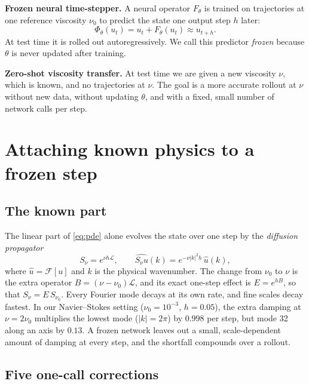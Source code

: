 \documentclass{article}
\theoremstyle{plain}
\newcommand{\F}{\mathcal{F}}
\newcommand{\Lop}{\mathcal{L}}
\begin{document}
\textbf{Frozen neural time-stepper.}
A neural operator $F_\theta$ is trained on trajectories at one reference viscosity $\nu_0$ to predict the state one output step $h$ later:
\begin{equation}
  \Phi_\theta(u_t) = u_t + F_\theta(u_t) \approx u_{t+h}.
  \label{eq:stepper}
\end{equation}
At test time it is rolled out autoregressively. We call this predictor \emph{frozen} because $\theta$ is never updated after training.

\textbf{Zero-shot viscosity transfer.}
At test time we are given a new viscosity $\nu$, which is known, and no trajectories at $\nu$.
The goal is a more accurate rollout at $\nu$ without new data, without updating $\theta$, and with a fixed, small number of network calls per step.

\section{Attaching known physics to a frozen step}
\label{sec:method}

\subsection{The known part}
\label{sec:known}

The linear part of \cref{eq:pde} alone evolves the state over one step by the \emph{diffusion propagator}
\begin{equation}
  S_\nu = e^{\nu h\Lop},\qquad
  \widehat{S_\nu u}(k) = e^{-\nu|k|^2h}\,\hat u(k),
  \label{eq:semigroup}
\end{equation}
where $\hat u=\F[u]$ and $k$ is the physical wavenumber.
The change from $\nu_0$ to $\nu$ is the extra operator $B=(\nu-\nu_0)\Lop$, and its exact one-step effect is $E=e^{hB}$, so that $S_\nu=E\,S_{\nu_0}$.
Every Fourier mode decays at its own rate, and fine scales decay fastest.
In our Navier--Stokes setting ($\nu_0=10^{-3}$, $h=0.05$), the extra damping at $\nu=2\nu_0$ multiplies the lowest mode ($|k|=2\pi$) by $0.998$ per step, but mode 32 along an axis by $0.13$.
A frozen network leaves out a small, scale-dependent amount of damping at every step, and the shortfall compounds over a rollout.

\subsection{Five one-call corrections}
\label{sec:corrections}
\end{document}
